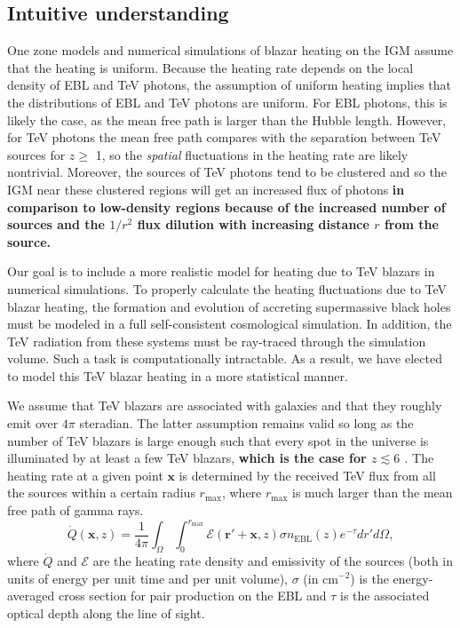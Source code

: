 \documentclass[twocolumns]{emulateapj}
\newcommand\Cc[1]{{\color{blue} \bf #1}} %
\begin{document}
\subsection{Intuitive understanding}
One zone models \citep{2012ApJ...752...23C,2012ApJ...752...24P} and numerical simulations  \citep{2012MNRAS.423..149P} of blazar heating on the IGM assume that the heating is uniform.  Because the heating rate depends on the local density of EBL and TeV photons, the assumption of uniform heating implies that the distributions of EBL and TeV photons are uniform.  For EBL photons, this is likely the case, as the mean free path is larger than the Hubble length. However, for TeV photons the mean free path compares with the separation between TeV sources for $z\geqslant$ 1, so the {\it spatial} fluctuations in the heating rate are likely nontrivial. Moreover, the sources of TeV photons tend to be clustered and so the IGM near these clustered regions will get an increased flux of photons \Cc{in comparison to low-density regions because of the increased number of sources and the $1/r^2$ flux dilution with increasing distance $r$ from the source.}

Our goal is to include a more realistic model for heating due to TeV blazars in numerical simulations.
To properly calculate the heating fluctuations due to TeV blazar heating, the formation and evolution of accreting supermassive black holes must be modeled in a full self-consistent cosmological simulation.  In addition, the TeV radiation from these systems must be ray-traced through the simulation volume.  Such a task is computationally intractable.  As a result, we have elected to model this TeV blazar heating in a more statistical manner.  

We assume that TeV blazars are associated with galaxies and that they roughly emit over $4\pi$ steradian.  The latter assumption remains valid so long as the number of TeV blazars is large enough such that every spot in the universe is illuminated by at least a few TeV blazars, \Cc{which is the case for $z\lesssim 6$ \citep{2012ApJ...752...23C}}. 
The heating rate at a given point $\mathbf{x}$ is determined by the received TeV flux from all the sources within a certain radius $r_{\mathrm{max}}$, where $r_{\mathrm{max}}$ is much larger than the mean free path of gamma rays.
\begin{equation}
\label{eq:heating_rate}
  \dot{Q}(\mathbf{x},z)= \frac{1}{4\pi}  \int_{\Omega}\int_0^{r_{\mathrm{max}}}   \mathcal{E}(\mathbf{r}'+\mathbf{x},z)\sigma n_{\mathrm{EBL}}(z) e^{-\tau}dr' d\Omega,
\end{equation}
where $\dot{Q}$ and $\mathcal{E}$ are the heating rate density and emissivity of the sources (both in units of energy per unit time and per unit volume), $\sigma$ (in cm$^{-2}$) is the energy-averaged cross section for pair production on the EBL and $\tau$ is the associated optical depth along the line of sight. 
\end{document}
